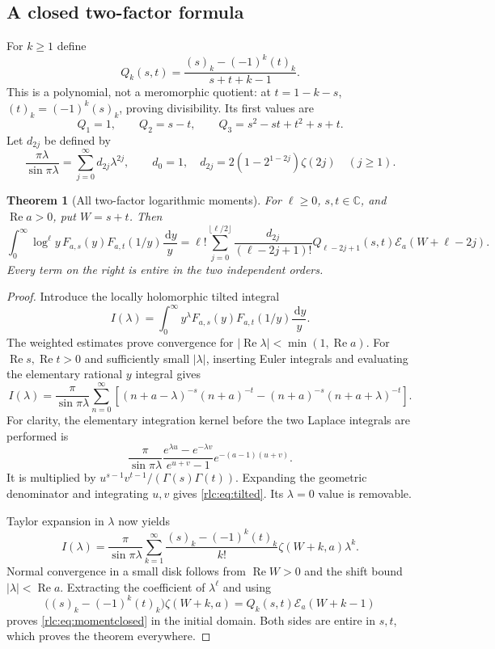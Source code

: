 \documentclass[11pt,a4paper]{article}
\numberwithin{equation}{section}
\newtheorem{theorem}{Theorem}[section]
\theoremstyle{definition}\newtheorem{definition}[theorem]{Definition}
\theoremstyle{remark}\newtheorem{remark}[theorem]{Remark}
\DeclareMathOperator{\Rea}{Re}
\newcommand{\dd}{\,\mathrm d}
\newcommand{\C}{\mathbb C}\newcommand{\R}{\mathbb R}\newcommand{\N}{\mathbb N}
\newcommand{\E}{\mathcal E}
\begin{document}
\subsection{A closed two-factor formula}
For $k\ge1$ define
\begin{equation}\label{rlc:eq:Q}
 Q_k(s,t)=\frac{(s)_k-(-1)^k(t)_k}{s+t+k-1}.
\end{equation}
This is a polynomial, not a meromorphic quotient: at
$t=1-k-s$, $(t)_k=(-1)^k(s)_k$, proving divisibility.
Its first values are
\[
 Q_1=1,\qquad Q_2=s-t,\qquad
 Q_3=s^2-st+t^2+s+t.
\]
Let $d_{2j}$ be defined by
\begin{equation}\label{rlc:eq:dcoeff}
 \frac{\pi\lambda}{\sin\pi\lambda}
 =\sum_{j=0}^\infty d_{2j}\lambda^{2j},\qquad
 d_0=1,\quad
 d_{2j}=2(1-2^{1-2j})\zeta(2j)\quad(j\ge1).
\end{equation}

\begin{theorem}[All two-factor logarithmic moments]
\label{rlc:thm:twomoments}
For $\ell\ge0$, $s,t\in\C$, and $\Rea a>0$, put $W=s+t$. Then
\begin{equation}\label{rlc:eq:momentclosed}
 \boxed{\displaystyle
 \int_0^\infty\log^\ell y\,F_{a,s}(y)F_{a,t}(1/y)\frac{\dd y}{y}
 =\ell!\sum_{j=0}^{\lfloor\ell/2\rfloor}
 \frac{d_{2j}}{(\ell-2j+1)!}
 Q_{\ell-2j+1}(s,t)\E_a(W+\ell-2j).}
\end{equation}
Every term on the right is entire in the two independent orders.
\end{theorem}
\begin{proof}
Introduce the locally holomorphic tilted integral
\[
 I(\lambda)=\int_0^\infty y^\lambda
 F_{a,s}(y)F_{a,t}(1/y)\frac{\dd y}{y}.
\]
The weighted estimates prove convergence for
$|\Rea\lambda|<\min(1,\Rea a)$. For
$\Rea s,\Rea t>0$ and sufficiently small $|\lambda|$, inserting
Euler integrals and evaluating the elementary rational $y$ integral
gives
\begin{equation}\label{rlc:eq:tilted}
 I(\lambda)=\frac{\pi}{\sin\pi\lambda}
 \sum_{n=0}^\infty\left[
 (n+a-\lambda)^{-s}(n+a)^{-t}
 -(n+a)^{-s}(n+a+\lambda)^{-t}\right].
\end{equation}
For clarity, the elementary integration kernel before the two Laplace
integrals are performed is
\[
 \frac{\pi}{\sin\pi\lambda}
 \frac{e^{\lambda u}-e^{-\lambda v}}{e^{u+v}-1}
 e^{-(a-1)(u+v)}.
\]
It is multiplied by $u^{s-1}v^{t-1}/(\Gamma(s)\Gamma(t))$.
Expanding the geometric denominator and integrating $u,v$ gives
\eqref{rlc:eq:tilted}. Its $\lambda=0$ value is removable.

Taylor expansion in $\lambda$ now yields
\[
 I(\lambda)=\frac{\pi}{\sin\pi\lambda}
 \sum_{k=1}^\infty
 \frac{(s)_k-(-1)^k(t)_k}{k!}
       \zeta(W+k,a)\lambda^k.
\]
Normal convergence in a small disk follows from $\Rea W>0$ and the
shift bound $|\lambda|<\Rea a$. Extracting the coefficient of
$\lambda^\ell$ and using
\[
 \bigl((s)_k-(-1)^k(t)_k\bigr)\zeta(W+k,a)
       =Q_k(s,t)\E_a(W+k-1)
\]
proves \eqref{rlc:eq:momentclosed} in the initial domain. Both sides
are entire in $s,t$, which proves the theorem everywhere.
\end{proof}
\end{document}
